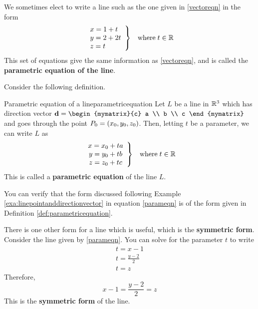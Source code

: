 We sometimes elect to write a line such as the one given in \ref{vectoreqn} in the form
\begin{equation}
\begin{array}{ll}
\left. \begin{array}{l}
x=1+t \\
y=2+2t \\
z=t 
\end{array} \right\} & 
\mbox{where} \; t\in \mathbb{R} 
\end{array}
\label{parameqn}
\end{equation}
This set of equations give the same information as \ref{vectoreqn}, and is called the \textbf{parametric equation of the line}. 

Consider the following definition. 

\begin{definition}{Parametric equation of a line}{parametricequation}
Let $L$ be a line in $\mathbb{R}^3$ which has direction vector $\vect{d} = \begin{mymatrix}{c}
a \\
b \\
c
\end{mymatrix}$
and goes through the point $P_0 = \left(x_0, y_0, z_0 \right)$.
Then, letting $t$ be a parameter, we can write $L$ as 
\begin{equation*}
\begin{array}{ll}
\left.
\begin{array}{c}
x = x_0 + ta \\
y = y_0 + tb \\
z = z_0 + tc
\end{array}
\right\} & 
\mbox{where} \; t\in \mathbb{R} 
\end{array}
\end{equation*}
This is called a \textbf{parametric equation} of the line $L$.
\end{definition}

You can verify that the form discussed following Example \ref{exa:linepointanddirectionvector} in equation  \ref{parameqn} is of the form
given in Definition \ref{def:parametricequation}.

There is one other form for a line which is useful, which is the \textbf{symmetric form}. 
Consider the line given by  \ref{parameqn}. You can
solve for the parameter $t$ to write
\begin{equation*}
\begin{array}{l}
t=x-1 \\
t=\frac{y-2}{2} \\
t=z
\end{array}
\end{equation*}
Therefore, 
\begin{equation*}
x-1=\frac{y-2}{2}=z
\end{equation*}
This is the \textbf{symmetric form} of the line.

